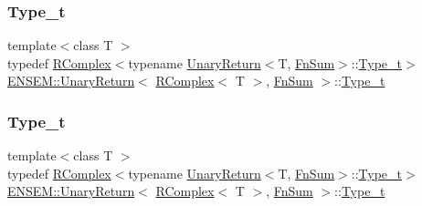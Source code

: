 \subsubsection{\texorpdfstring{Type\_t}{Type\_t}\hspace{0.1cm}{\footnotesize\ttfamily [1/3]}}
{\footnotesize\ttfamily template$<$class T $>$ \\
typedef \mbox{\hyperlink{classENSEM_1_1RComplex}{R\+Complex}}$<$typename \mbox{\hyperlink{structENSEM_1_1UnaryReturn}{Unary\+Return}}$<$T, \mbox{\hyperlink{structENSEM_1_1FnSum}{Fn\+Sum}}$>$\+::\mbox{\hyperlink{structENSEM_1_1UnaryReturn_3_01RComplex_3_01T_01_4_00_01FnSum_01_4_a466a9eef64139dc94681a73722d48328}{Type\+\_\+t}}$>$ \mbox{\hyperlink{structENSEM_1_1UnaryReturn}{E\+N\+S\+E\+M\+::\+Unary\+Return}}$<$ \mbox{\hyperlink{classENSEM_1_1RComplex}{R\+Complex}}$<$ T $>$, \mbox{\hyperlink{structENSEM_1_1FnSum}{Fn\+Sum}} $>$\+::\mbox{\hyperlink{structENSEM_1_1UnaryReturn_3_01RComplex_3_01T_01_4_00_01FnSum_01_4_a466a9eef64139dc94681a73722d48328}{Type\+\_\+t}}}

\mbox{\label{structENSEM_1_1UnaryReturn_3_01RComplex_3_01T_01_4_00_01FnSum_01_4_a466a9eef64139dc94681a73722d48328}} 
\subsubsection{\texorpdfstring{Type\_t}{Type\_t}\hspace{0.1cm}{\footnotesize\ttfamily [2/3]}}
{\footnotesize\ttfamily template$<$class T $>$ \\
typedef \mbox{\hyperlink{classENSEM_1_1RComplex}{R\+Complex}}$<$typename \mbox{\hyperlink{structENSEM_1_1UnaryReturn}{Unary\+Return}}$<$T, \mbox{\hyperlink{structENSEM_1_1FnSum}{Fn\+Sum}}$>$\+::\mbox{\hyperlink{structENSEM_1_1UnaryReturn_3_01RComplex_3_01T_01_4_00_01FnSum_01_4_a466a9eef64139dc94681a73722d48328}{Type\+\_\+t}}$>$ \mbox{\hyperlink{structENSEM_1_1UnaryReturn}{E\+N\+S\+E\+M\+::\+Unary\+Return}}$<$ \mbox{\hyperlink{classENSEM_1_1RComplex}{R\+Complex}}$<$ T $>$, \mbox{\hyperlink{structENSEM_1_1FnSum}{Fn\+Sum}} $>$\+::\mbox{\hyperlink{structENSEM_1_1UnaryReturn_3_01RComplex_3_01T_01_4_00_01FnSum_01_4_a466a9eef64139dc94681a73722d48328}{Type\+\_\+t}}}


